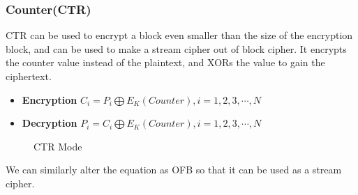 \documentclass{report}
\begin{document}
			\subsubsection{Counter(CTR)}
				CTR can be used to encrypt a block even smaller than the size of the encryption block, and can be used to make a stream cipher out of block cipher. It encrypts the counter value instead of the plaintext, and XORs the value to gain the ciphertext.
				\begin{itemize}
					\item \textbf{Encryption} $C_i=P_i \bigoplus E_K(Counter), i=1,2,3,\cdots,N$
					\item \textbf{Decryption} $P_i=C_i \bigoplus E_K(Counter), i=1,2,3,\cdots,N$
				\end{itemize}
				\begin{figure}[h!]
					\centering
					 \label{fig-CTR-ENC}
					\qquad
					 \label{fig-CTR-DEC}
					\caption{CTR Mode}
					\label{fig-CTR}
				\end{figure}
				We can similarly alter the equation as OFB so that it can be used as a stream cipher.
			
\end{document}
